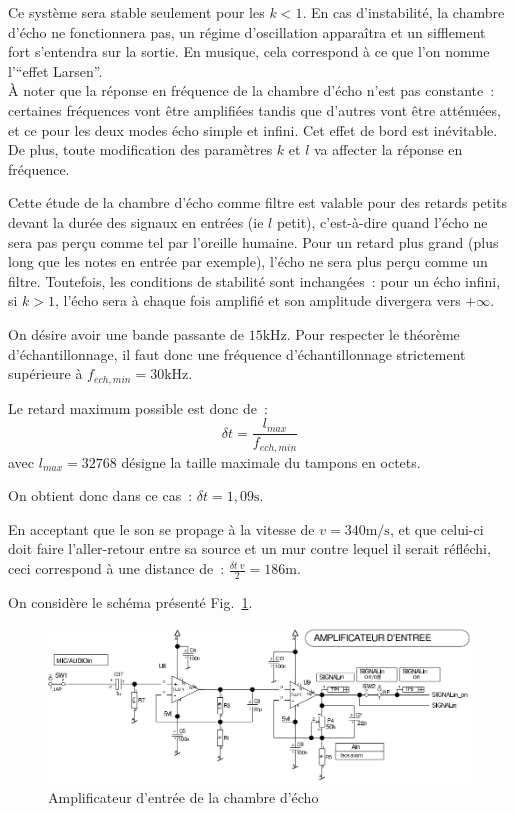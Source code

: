 \documentclass{article}
\begin{document}
Ce système sera stable seulement pour les $k<1$. En cas d'instabilité, la chambre d'écho ne fonctionnera pas, un régime d'oscillation apparaîtra et un sifflement fort s'entendra sur la sortie. En musique, cela correspond à ce que l'on nomme l'``effet Larsen''.
\\

À noter que la réponse en fréquence de la chambre d'écho n'est pas constante~: certaines fréquences vont être amplifiées tandis que d'autres vont être atténuées, et ce pour les deux modes écho simple et infini. Cet effet de bord est inévitable. De plus, toute modification des paramètres $k$ et $l$ va affecter la réponse en fréquence.

Cette étude de la chambre d'écho comme filtre est valable pour des retards petits devant la durée des signaux en entrées (ie $l$ petit), c'est-à-dire quand l'écho ne sera pas perçu comme tel par l'oreille humaine. Pour un retard plus grand (plus long que les notes en entrée par exemple), l'écho ne sera plus perçu comme un filtre. Toutefois, les conditions de stabilité sont inchangées~: pour un écho infini, si $k>1$, l'écho sera à chaque fois amplifié et son amplitude divergera vers $+\infty$. 


On désire avoir une bande passante de $15 \mathrm{kHz}$. Pour respecter le théorème d'échantillonnage, il faut donc une fréquence d'échantillonnage strictement supérieure à $f_{ech,min} = 30 \mathrm{kHz}$.

Le retard maximum possible est donc de~: \begin{equation}
\delta t = \frac{l_{max}}{f_{ech,min}}
\end{equation}
avec $l_{max} = 32768$ désigne la taille maximale du tampons en octets.

On obtient donc dans ce cas~: $\delta t = 1,09 \mathrm{s}$.

En acceptant que le son se propage à la vitesse de $v = 340 \mathrm{m/s}$, et que celui-ci doit faire l'aller-retour entre sa source et un mur contre lequel il serait réfléchi, ceci correspond à une distance de~: $\frac{\delta t~v}{2} = 186\mathrm{m}$.


On considère le schéma présenté Fig.~\ref{fig:ampl}.

\begin{figure}[h]
	\centering
	\includegraphics[width=.8\textwidth]{shema_echo_entree.png}
	\caption{Amplificateur d'entrée de la chambre d'écho}
	\label{fig:ampl}
\end{figure}
\end{document}
